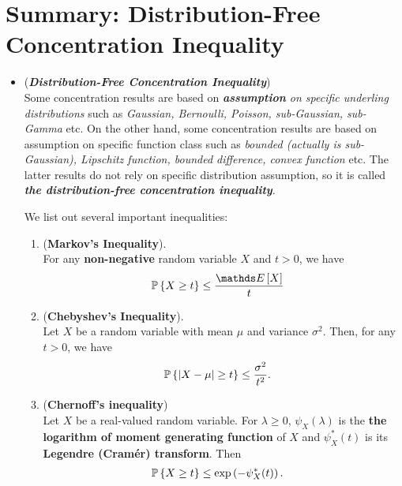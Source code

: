 \documentclass[11pt]{article}
\begin{document}
\newpage
\section{Summary: Distribution-Free Concentration Inequality}
\begin{itemize}
\item \begin{remark} (\textbf{\emph{Distribution-Free Concentration Inequality}}) \\
Some concentration results are based on \emph{\textbf{assumption} on specific underling distributions} such as \emph{Gaussian, Bernoulli, Poisson, sub-Gaussian, sub-Gamma} etc. On the other hand, some concentration results are based on assumption on specific function class such as \emph{bounded (actually is sub-Gaussian), Lipschitz function, bounded difference, convex function} etc. The latter results do not rely on specific distribution assumption, so it is called \emph{\textbf{the distribution-free concentration inequality}}. 

We list out several important inequalities:
\begin{enumerate}
\item \begin{theorem} (\textbf{Markov's Inequality}). \citep{vershynin2018high}\\
For any \textbf{non-negative} random variable $X$ and $t > 0$, we have
\begin{align*}
\bP\set{X \ge t} &\le \frac{\E{}{X}}{t} 
\end{align*}
\end{theorem}

\item \begin{theorem} (\textbf{Chebyshev's Inequality}). \citep{vershynin2018high}\\
Let $X$ be a random variable with mean $\mu$ and variance $\sigma^2$. Then, for any $t > 0$, we have
\begin{align*}
{\mathbb P}\left\{\left\lvert X - \mu \right\rvert \ge t\right\} &\le \frac{\sigma^2}{t^2}. 
\end{align*}
\end{theorem}

\item \begin{theorem} (\textbf{Chernoff's inequality}) \citep{boucheron2013concentration}\\
Let $X$ be a real-valued random variable. For $\lambda \ge 0$,  $\psi_{X}(\lambda)$ is the \textbf{the logarithm of moment generating function} of $X$ and $\psi^{*}_{X}(t)$ is its \textbf{Legendre (Cram{\'e}r) transform}. Then 
\begin{align*}
{\mathbb P}\left\{X \ge t\right\} &\le \exp\left(-\psi^{*}_{X}(t)\right). 
\end{align*}
\end{theorem}


\end{enumerate}
\end{remark}
\end{itemize}
\end{document}
